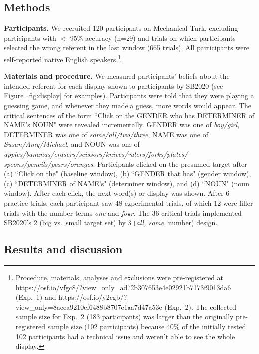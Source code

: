 \documentclass[10pt,letterpaper]{article}
\newcommand{\figref}[1]{Figure~\ref{#1}}
\begin{document}
\subsection{Methods}

\textbf{Participants.} We recruited 120 participants on Mechanical Turk, excluding participants with $<$ 95\% accuracy (n=29) and trials on which participants selected the wrong referent in the last window (665 trials). All participants were self-reported native English speakers.\footnote{Procedure, materials, analyses and exclusions were pre-registered at https://osf.io/vfgc8/?view\_only=ad72b307653e4e02921b7173f9013\hspace{3pt}da6 (Exp.~1) and https://osf.io/y2cgb/?view\_only=8acea9210ef6488b\hspace{3pt}8707e1aa7d47a53e (Exp.~2). The collected sample size for Exp.~2 (183 participants) was larger than the originally pre-registered sample size (102 participants) because 40\% of the initially tested 102 participants had a technical issue and weren't able to see the whole display.}

\textbf{Materials and procedure.} We measured participants' beliefs about the intended referent for each display shown to participants by SB2020 (see \figref{fig:display} for examples). Participants were told that they were playing a guessing game, and whenever they made a guess, more words would appear. The critical sentences of the form ``Click on the GENDER who has DETERMINER  of NAME's NOUN" were revealed incrementally. GENDER was one of \emph{boy/girl}, DETERMINER was one of \emph{some/all/two/three}, NAME was one of \emph{Susan/Amy/Michael}, and NOUN was one of \emph{apples/bananas/erasers/scissors/knives/rulers/forks/plates/
spoons/pencils/pears/oranges}.  Participants clicked on the presumed target after (a) ``Click on the" (baseline window), (b) ``GENDER that has" (gender window), (c) ``DETERMINER of NAME's" (determiner window), and (d) ``NOUN" (noun window). After each click, the next word(s) or display was shown. After 6 practice trials, each participant saw 48 experimental trials, of which 12 were filler trials with the number terms \emph{one} and \emph{four}. The 36 critical trials implemented SB2020's 2 (big vs.~small target set) by 3 (\emph{all, some}, number) design. 


\subsection{Results and discussion}
\end{document}
